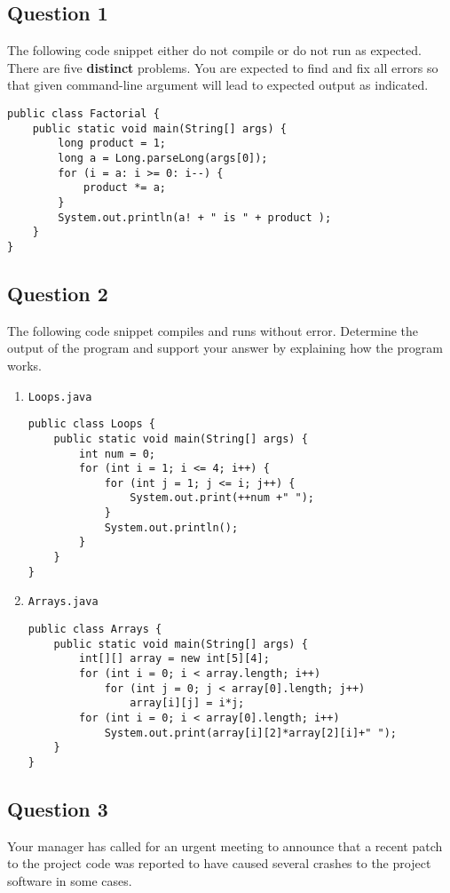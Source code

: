 \subsection*{Question 1}
The following code snippet either do not compile or do not run as expected. There are five \textbf{distinct} problems. You are expected to find and fix all errors so that given command-line argument will lead to expected output as indicated.

\begin{lstlisting}
public class Factorial {
	public static void main(String[] args) {
		long product = 1;
		long a = Long.parseLong(args[0]);
		for (i = a: i >= 0: i--) {
			product *= a;
		}
		System.out.println(a! + " is " + product );
	}
}
\end{lstlisting}

\newpage
\subsection*{Question 2}
The following code snippet compiles and runs without error. Determine the output of the program and support your answer by explaining how the program works.

\begin{enumerate}[label=(\alph*)]
\item \texttt{Loops.java}
\begin{lstlisting}
public class Loops {
	public static void main(String[] args) {
		int num = 0;
		for (int i = 1; i <= 4; i++) {
			for (int j = 1; j <= i; j++) {
				System.out.print(++num +" ");
			}
			System.out.println();
		}
	}
}
\end{lstlisting}
\item \texttt{Arrays.java}
\begin{lstlisting}
public class Arrays {
	public static void main(String[] args) {
		int[][] array = new int[5][4];
		for (int i = 0; i < array.length; i++)
			for (int j = 0; j < array[0].length; j++)
				array[i][j] = i*j;
		for (int i = 0; i < array[0].length; i++)
			System.out.print(array[i][2]*array[2][i]+" ");
	}
}
\end{lstlisting}
\end{enumerate}

\newpage
\subsection*{Question 3}
Your manager has called for an urgent meeting to announce that a recent patch to the project code was reported to have caused several crashes to the project software in some cases.

